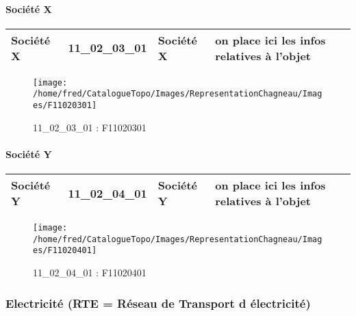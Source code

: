 \documentclass[12pt,titlepage,oneside]{book}
\begin{document}
\paragraph{Société X}
\noindent
\vspace{\baselineskip}

\renewcommand{\arraystretch}{1.2}
\begin{supertabular}{|p{10cm}|c|p{13cm}|p{12cm}|}
 Société X & 11\_02\_03\_01 & Société X & on place ici les infos relatives à l'objet\\
\hline
\end{supertabular}
\begin{figure}[h!]
  \hfill         %
  \begin{minipage}[t]{3cm}
    \begin{center}
      \texttt{[image: /home/fred/CatalogueTopo/Images/RepresentationChagneau/Images/F11020301]}
      \caption[F11020301]{\label{} 11\_02\_03\_01 : F11020301}
    \end{center}
  \end{minipage}
\end{figure}


\paragraph{Société Y}
\noindent
\vspace{\baselineskip}

\renewcommand{\arraystretch}{1.2}
\begin{supertabular}{|p{10cm}|c|p{13cm}|p{12cm}|}
 Société Y & 11\_02\_04\_01 & Société Y & on place ici les infos relatives à l'objet\\
\hline
\end{supertabular}
\begin{figure}[h!]
  \hfill         %
  \begin{minipage}[t]{3cm}
    \begin{center}
      \texttt{[image: /home/fred/CatalogueTopo/Images/RepresentationChagneau/Images/F11020401]}
      \caption[F11020401]{\label{} 11\_02\_04\_01 : F11020401}
    \end{center}
  \end{minipage}
\end{figure}

\subsubsection{\large Electricité (RTE = Réseau de Transport d électricité)}
\end{document}
